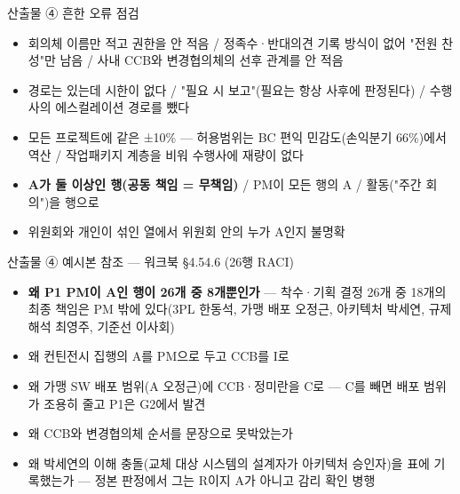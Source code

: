 \begin{frame}{산출물 ④ 흔한 오류 점검}
\begin{itemize}
\item 회의체 이름만 적고 권한을 안 적음 / 정족수·반대의견 기록 방식이 없어 "전원 찬성"만 남음 / 사내 CCB와 변경협의체의 선후 관계를 안 적음
\item 경로는 있는데 시한이 없다 / "필요 시 보고"(필요는 항상 사후에 판정된다) / 수행사의 에스컬레이션 경로를 뺐다
\item 모든 프로젝트에 같은 ±10\% — 허용범위는 BC 편익 민감도(손익분기 66\%)에서 역산 / 작업패키지 계층을 비워 수행사에 재량이 없다
\item \textbf{A가 둘 이상인 행(공동 책임 = 무책임)} / PM이 모든 행의 A / 활동("주간 회의")을 행으로
\item 위원회와 개인이 섞인 열에서 위원회 안의 누가 A인지 불명확
\end{itemize}
\end{frame}

\begin{frame}{산출물 ④ 예시본 참조 — 워크북 §4.5\til{}4.6 (26행 RACI)}
\begin{itemize}
\item \textbf{왜 P1 PM이 A인 행이 26개 중 8개뿐인가} — 착수·기획 결정 26개 중 18개의 최종 책임은 PM 밖에 있다(3PL 한동석, 가맹 배포 오정근, 아키텍처 박세연, 규제 해석 최영주, 기준선 이사회)
\item 왜 컨틴전시 집행의 A를 PM으로 두고 CCB를 I로
\item 왜 가맹 SW 배포 범위(A 오정근)에 CCB·정미란을 C로 — C를 빼면 배포 범위가 조용히 줄고 P1은 G2에서 발견
\item 왜 CCB와 변경협의체 순서를 문장으로 못박았는가
\item 왜 박세연의 이해 충돌(교체 대상 시스템의 설계자가 아키텍처 승인자)을 표에 기록했는가 — 정본 판정에서 그는 R이지 A가 아니고 감리 확인 병행
\end{itemize}
\end{frame}

